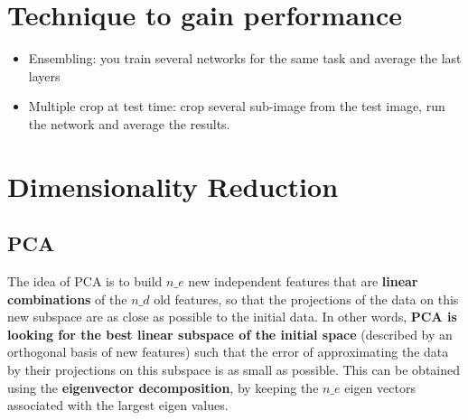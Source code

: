 \section{Technique to gain performance}
\begin{itemize}
    \item Ensembling: you train several networks for the same task and average the last layers
    \item Multiple crop at test time: crop several sub-image from the test image, run the network and average the results.
\end{itemize}

\section{Dimensionality Reduction}
\subsection{PCA}
The idea of PCA is to build $n\_e$ new independent features that are \textbf{linear combinations} of the $n\_d$ old features, so that the projections of the data on this new subspace are as close as possible to the initial data. In other words, \textbf{PCA is looking for the best linear subspace of the initial space} (described by an orthogonal basis of new features) such that the error of approximating the data by their projections on this subspace is as small as possible.
This can be obtained using the \textbf{eigenvector decomposition}, by keeping the $n\_e$ eigen vectors associated with the largest eigen values.

